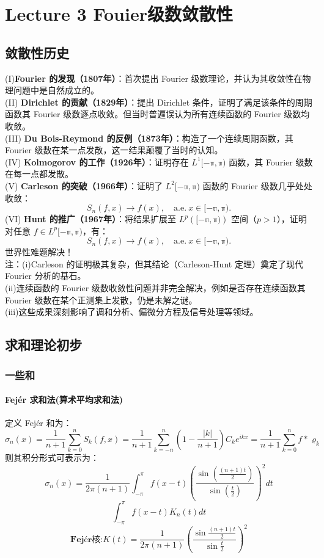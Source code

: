 \documentclass[linespread=1.5,openany]{book}%
\theoremstyle{plain}
\begin{document}
		\part{Lecture 3 Fouier级数敛散性}{
			
			\chapter{敛散性历史}
			{
				(I)\textbf{Fourier 的发现（1807年）}：首次提出 Fourier 级数理论，并认为其收敛性在物理问题中是自然成立的。\\
				(II) \textbf{Dirichlet 的贡献（1829年）}：提出 Dirichlet 条件，证明了满足该条件的周期函数其 Fourier 级数逐点收敛。但当时普遍误认为所有连续函数的 Fourier 级数均收敛。\\
				(III) \textbf{Du Bois-Reymond 的反例（1873年）}：构造了一个连续周期函数，其 Fourier 级数在某一点发散，这一结果颠覆了当时的认知。\\
				(IV) \textbf{Kolmogorov 的工作（1926年）}：证明存在 $L^1\mathbb{[-\pi,\pi)}$ 函数，其 Fourier 级数在每一点都发散。\\
				(V) \textbf{Carleson 的突破（1966年）}：证明了 $L^2\mathbb{[-\pi,\pi)}$ 函数的 Fourier 级数几乎处处收敛：
				\[	S_n(f,x) \rightarrow f(x), \quad \text{a.e.} \ x \in \mathbb{[-\pi,\pi)}.\]
				(VI) \textbf{Hunt 的推广（1967年）}：将结果扩展至 $L^p(\mathbb{[-\pi,\pi)})$ 空间（$p>1$），证明对任意 $f \in L^p\mathbb{[-\pi,\pi)}$，有：
				\[
				S_n(f,x) \rightarrow f(x), \quad \text{a.e.} \ x \in \mathbb{[-\pi,\pi)}.
				\]
				世界性难题解决！\\
				注：(i)Carleson 的证明极其复杂，但其结论（Carleson-Hunt 定理）奠定了现代 Fourier 分析的基石。\\
				(ii)连续函数的 Fourier 级数收敛性问题并非完全解决，例如是否存在连续函数其 Fourier 级数在某个正测集上发散，仍是未解之谜。\\
				(iii)这些成果深刻影响了调和分析、偏微分方程及信号处理等领域。
			}
			\chapter{求和理论初步}
			{
				\section{一些和}{
					\subsection{Fejér 求和法(算术平均求和法)}
					{定义 Fejér 和为：\[
						\sigma_n(x) = \frac{1}{n+1} \sum_{k=0}^n S_k(f,x) = \frac{1}{n+1} \sum_{k=-n}^n \left( 1 - \frac{|k|}{n+1} \right) C_k e^{ikx}
						=\frac{1}{n+1}\sum_{k=0}^nf*\varrho_k\]
						则其积分形式可表示为：
						\[
						\sigma_n(x) = \frac{1}{2\pi(n+1)} \int_{-\pi}^{\pi} f(x-t) \left( \frac{\sin\left( \frac{(n+1)t}{2} \right)}{\sin\left( \frac{t}{2} \right)} \right)^2 dt
						\]\[ \int_{-\pi}^{\pi} f(x-t)K_n(t) dt\]
						\[\textbf{Fej\'{e}r核:}K{(t)}= \frac{1}{2\pi(n+1)}(\frac{\sin \frac{(n+1)t}{2} }{\sin  \frac{t}{2}  }  )^2\]
					}
}}}
\end{document}
